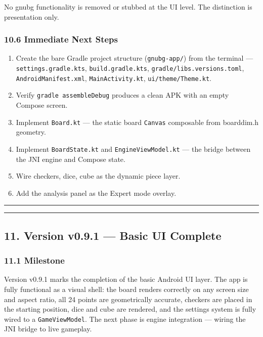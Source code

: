 \documentclass[11pt,a4paper]{article}
\providecommand{\tightlist}{\setlength{\itemsep}{2pt}\setlength{\parskip}{0pt}}
\begin{document}
No gnubg functionality is removed or stubbed at the UI level. The
distinction is presentation only.

\subsubsection{10.6 Immediate Next Steps}\label{immediate-next-steps-v09}

\begin{enumerate}
\def\labelenumi{\arabic{enumi}.}
\tightlist
\item
  Create the bare Gradle project structure (\texttt{gnubg-app/}) from
  the terminal --- \texttt{settings.gradle.kts},
  \texttt{build.gradle.kts}, \texttt{gradle/libs.versions.toml},
  \texttt{AndroidManifest.xml}, \texttt{MainActivity.kt},
  \texttt{ui/theme/Theme.kt}.
\item
  Verify \texttt{gradle assembleDebug} produces a clean APK with an
  empty Compose screen.
\item
  Implement \texttt{Board.kt} --- the static board \texttt{Canvas}
  composable from boarddim.h geometry.
\item
  Implement \texttt{BoardState.kt} and \texttt{EngineViewModel.kt} ---
  the bridge between the JNI engine and Compose state.
\item
  Wire checkers, dice, cube as the dynamic piece layer.
\item
  Add the analysis panel as the Expert mode overlay.
\end{enumerate}

\begin{center}\rule{0.5\linewidth}{0.5pt}\end{center}

\begin{center}\rule{0.5\linewidth}{0.5pt}\end{center}

\subsection{11. Version v0.9.1 --- Basic UI
Complete}\label{version-v091-basic-ui-complete}

\subsubsection{11.1 Milestone}\label{milestone-v091}

Version v0.9.1 marks the completion of the basic Android UI layer. The
app is fully functional as a visual shell: the board renders correctly
on any screen size and aspect ratio, all 24 points are geometrically
accurate, checkers are placed in the starting position, dice and cube
are rendered, and the settings system is fully wired to a
\texttt{GameViewModel}. The next phase is engine integration --- wiring
the JNI bridge to live gameplay.
\end{document}
